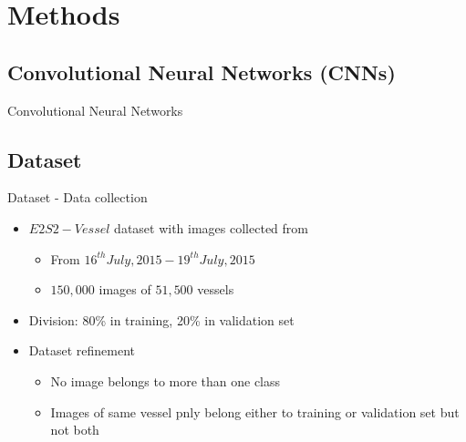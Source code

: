 \documentclass[slidestop,compress,mathserif,notes]{beamer}
\begin{document}
\section{Methods}
\subsection{Convolutional Neural Networks (CNNs)}
\begin{frame}{Convolutional Neural Networks}
\end{frame}

\subsection{Dataset}
\begin{frame}{Dataset - Data collection}
    \begin{itemize}
        \item $E2S2-Vessel$ dataset with images collected from 
        \begin{itemize}
            \item From $16^{th} July, 2015 - 19^{th} July, 2015$
            \item $150,000$ images of $51,500$ vessels
        \end{itemize}
        \item Division: 80\% in training, 20\% in validation set
        \item Dataset refinement
        \begin{itemize}
            \item No image belongs to more than one class
            \item Images of same vessel pnly belong either to training or validation set but not both
        \end{itemize} 
    \end{itemize}
\end{frame}
\end{document}
